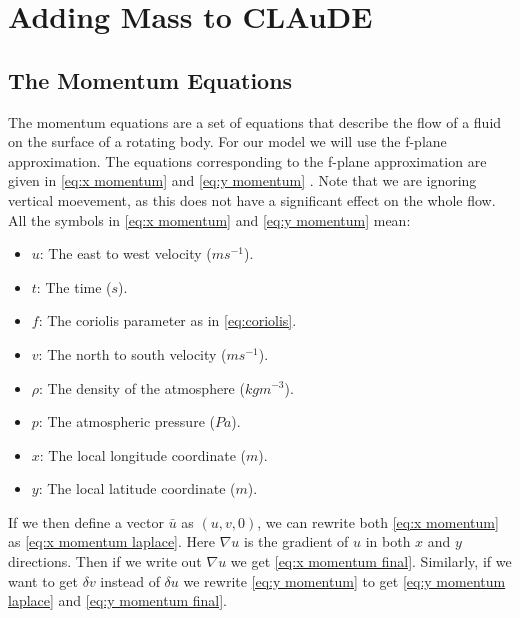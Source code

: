 \section{Adding Mass to CLAuDE}
\subsection{The Momentum Equations}
The momentum equations are a set of equations that describe the flow of a fluid on the surface of a rotating body. For our model we will use the f-plane approximation. The equations corresponding
to the f-plane approximation are given in \autoref{eq:x momentum} and \autoref{eq:y momentum} \cite{momentumeqs}. Note that we are ignoring vertical moevement, as this does not have a significant
effect on the whole flow. All the symbols in \autoref{eq:x momentum} and \autoref{eq:y momentum} mean:

\begin{itemize}
    \item $u$: The east to west velocity ($ms^{-1}$).
    \item $t$: The time ($s$).
    \item $f$: The coriolis parameter as in \autoref{eq:coriolis}.
    \item $v$: The north to south velocity ($ms^{-1}$).
    \item $\rho$: The density of the atmosphere ($kgm^{-3}$).
    \item $p$: The atmospheric pressure ($Pa$).
    \item $x$: The local longitude coordinate ($m$).
    \item $y$: The local latitude coordinate ($m$).
\end{itemize}

If we then define a vector $\bar{u}$ as $(u, v, 0)$, we can rewrite both \autoref{eq:x momentum} as \autoref{eq:x momentum laplace}. Here $\nabla u$ is the gradient of 
$u$ in both $x$ and $y$ directions. Then if we write out $\nabla u$ we get \autoref{eq:x momentum final}. Similarly, if we want to get $\delta v$ instead of $\delta u$ we rewrite 
\autoref{eq:y momentum} to get \autoref{eq:y momentum laplace} and \autoref{eq:y momentum final}.

